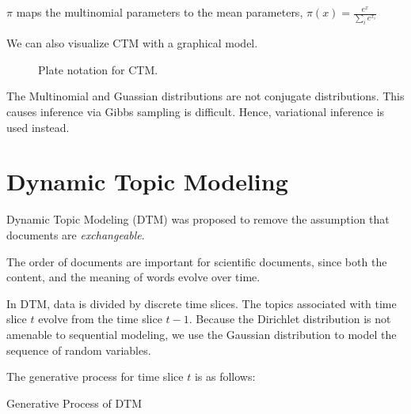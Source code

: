 \documentclass[letterpaper]{article}
\begin{document}
$\pi$ maps the multinomial parameters to the mean parameters,
$\pi\left( x \right) = \frac{e^x}{\sum_{i} e^{x_i}}$

We can also visualize CTM with a graphical model.

\begin{figure}[ht]
  \centering
  \caption{\label{fig:ctm_plate} Plate notation for CTM.}
\end{figure}


The Multinomial and Guassian distributions are not conjugate
distributions. This causes inference via Gibbs sampling is difficult.
Hence, variational inference is used instead.


\section{Dynamic Topic Modeling}
\label{sec:dtm}
Dynamic Topic Modeling (DTM) was proposed to remove the assumption
that documents are \textit{exchangeable}. \cite{blei2006dynamic}

The order of documents are important for scientific documents, since
both the content, and the meaning of words evolve over time.

In DTM, data is divided by discrete time slices. The topics associated
with time slice $t$ evolve from the time slice $t-1$. Because the
Dirichlet distribution is not amenable to sequential modeling, we use
the Gaussian distribution to model the sequence of random variables.

The generative process for time slice $t$ is as follows:

\begin{algorithm}
  \caption{Generative Process of DTM}\label{alg:DTM}
  \begin{algorithmic}[1]
    \EndFor
    \EndFor
  \end{algorithmic}
\end{algorithm}
\end{document}
